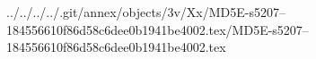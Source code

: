 ../../../../.git/annex/objects/3v/Xx/MD5E-s5207--184556610f86d58c6dee0b1941be4002.tex/MD5E-s5207--184556610f86d58c6dee0b1941be4002.tex